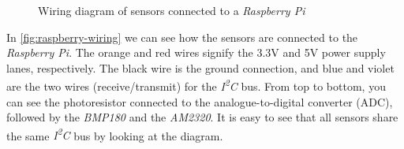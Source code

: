 \begin{figure}[H]
  \centering
  \caption{Wiring diagram of sensors connected to a \textit{Raspberry Pi}}
  \label{fig:raspberry-wiring}
\end{figure}

In \autoref{fig:raspberry-wiring} we can see how the sensors are connected to the \textit{Raspberry
Pi}. The orange and red wires signify the 3.3V and 5V power supply lanes, respectively. The black
wire is the ground connection, and blue and violet are the two wires (receive/transmit) for the
\textit{I\textsuperscript{2}C} bus. From top to bottom, you can see the photoresistor connected to
the analogue-to-digital converter (ADC), followed by the \textit{BMP180} and the \textit{AM2320}. It
is easy to see that all sensors share the same \textit{I\textsuperscript{2}C} bus by looking at the
diagram.
